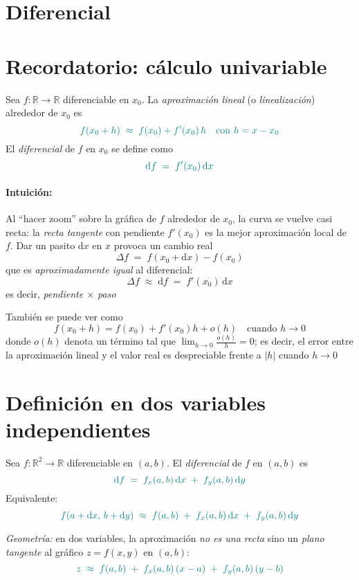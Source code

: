 \documentclass{article}
\begin{document}
\section{Diferencial}




\section*{Recordatorio: cálculo univariable}

Sea \(f:\mathbb{R}\to\mathbb{R}\) diferenciable en \(x_0\). La \emph{aproximación lineal} (o \emph{linealización}) alrededor de \(x_0\) es
\[
\color{teal}
f(x_0+h) \;\approx\; f(x_0) + f'(x_0)\,h
\quad \text{con } h=x-x_0
\]
El \emph{diferencial} de \(f\) en \(x_0\) se define como
\[
\color{teal}
\mathrm{d}f \;=\; f'(x_0)\,\mathrm{d}x
\]

\paragraph*{Intuición:}
Al “hacer zoom” sobre la gráfica de \(f\) alrededor de \(x_0\), la curva se vuelve casi recta: la \emph{recta tangente} con pendiente \(f'(x_0)\) es la mejor aproximación local de \(f\).
Dar un pasito \(\mathrm{d}x\) en \(x\) provoca un cambio real
\[
\Delta f \;=\; f(x_0+\mathrm{d}x)-f(x_0)
\]
que es \emph{aproximadamente igual} al diferencial:
\[
\Delta f \;\approx\; \mathrm{d}f \;=\; f'(x_0)\,\mathrm{d}x
\]
es decir, {\color{teal}\emph{pendiente \(\times\) paso}}

También se puede ver como
\[
f(x_0+h)=f(x_0)+f'(x_0)h+o(h)\quad \text{cuando } h\to 0
\]
donde \(o(h)\) denota un término tal que \(\displaystyle \lim_{h\to 0}\frac{o(h)}{h}=0\);
es decir, el error entre la aproximación lineal y el valor real es despreciable frente a \(|h|\) cuando \(h\to 0\)

\section*{Definición en dos variables independientes}

Sea \(f:\mathbb{R}^2\to\mathbb{R}\) diferenciable en \((a,b)\). El \emph{diferencial} de \(f\) en \((a,b)\) es
\[
\color{teal}
\mathrm{d}f \;=\; f_x(a,b)\,\mathrm{d}x \;+\; f_y(a,b)\,\mathrm{d}y
\]
Equivalente:
\[
\color{teal}
f(a+\mathrm{d}x,\,b+\mathrm{d}y)\;\approx\; f(a,b) \;+\; f_x(a,b)\,\mathrm{d}x \;+\; f_y(a,b)\,\mathrm{d}y
\]

\noindent\textit{Geometría:} en dos variables, la aproximación \emph{no es una recta} sino un \emph{plano tangente} al gráfico \(z=f(x,y)\) en \((a,b)\):
\[
\color{teal}
z \;\approx\; f(a,b) \;+\; f_x(a,b)\,(x-a) \;+\; f_y(a,b)\,(y-b)
\]
\end{document}
